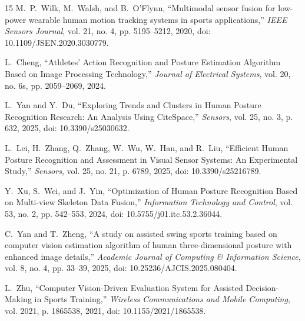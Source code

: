 \documentclass[conference]{IEEEtran}
\begin{document}
\begin{thebibliography}{15}
M.~P.~Wilk, M.~Walsh, and B.~O'Flynn, ``Multimodal sensor fusion for low-power wearable human motion tracking systems in sports applications,'' \emph{IEEE Sensors Journal}, vol. 21, no. 4, pp. 5195--5212, 2020, doi: 10.1109/JSEN.2020.3030779.

L.~Cheng, ``Athletes' Action Recognition and Posture Estimation Algorithm Based on Image Processing Technology,'' \emph{Journal of Electrical Systems}, vol. 20, no. 6s, pp. 2059--2069, 2024.

L.~Yan and Y.~Du, ``Exploring Trends and Clusters in Human Posture Recognition Research: An Analysis Using CiteSpace,'' \emph{Sensors}, vol. 25, no. 3, p. 632, 2025, doi: 10.3390/s25030632.

L.~Lei, H.~Zhang, Q.~Zhang, W.~Wu, W.~Han, and R.~Liu, ``Efficient Human Posture Recognition and Assessment in Visual Sensor Systems: An Experimental Study,'' \emph{Sensors}, vol. 25, no. 21, p. 6789, 2025, doi: 10.3390/s25216789.

Y.~Xu, S.~Wei, and J.~Yin, ``Optimization of Human Posture Recognition Based on Multi-view Skeleton Data Fusion,'' \emph{Information Technology and Control}, vol. 53, no. 2, pp. 542--553, 2024, doi: 10.5755/j01.itc.53.2.36044.

C.~Yan and T.~Zheng, ``A study on assisted swing sports training based on computer vision estimation algorithm of human three-dimensional posture with enhanced image details,'' \emph{Academic Journal of Computing \& Information Science}, vol. 8, no. 4, pp. 33--39, 2025, doi: 10.25236/AJCIS.2025.080404.

L.~Zhu, ``Computer Vision-Driven Evaluation System for Assisted Decision-Making in Sports Training,'' \emph{Wireless Communications and Mobile Computing}, vol. 2021, p. 1865538, 2021, doi: 10.1155/2021/1865538.

\end{thebibliography}
\end{document}
